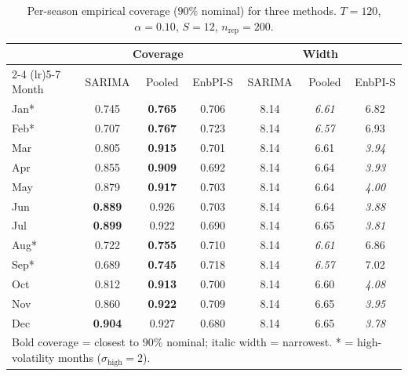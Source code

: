 \begin{table}[ht]
\centering
\caption{Per-season empirical coverage ($90\%$ nominal) for three methods.
$T=120$, $\alpha=0.10$, $S=12$, $n_{\mathrm{rep}}=200$.}
\label{tab:e1_three_methods_T120}
\begin{tabular}{l ccc ccc}
\toprule
 & \multicolumn{3}{c}{Coverage} & \multicolumn{3}{c}{Width} \\
\cmidrule(lr){2-4} \cmidrule(lr){5-7}
Month & SARIMA & Pooled & EnbPI-S & SARIMA & Pooled & EnbPI-S \\
\midrule
Jan* & 0.745 & \textbf{0.765} & 0.706 & 8.14 & \textit{6.61} & 6.82 \\
Feb* & 0.707 & \textbf{0.767} & 0.723 & 8.14 & \textit{6.57} & 6.93 \\
Mar & 0.805 & \textbf{0.915} & 0.701 & 8.14 & 6.61 & \textit{3.94} \\
Apr & 0.855 & \textbf{0.909} & 0.692 & 8.14 & 6.64 & \textit{3.93} \\
May & 0.879 & \textbf{0.917} & 0.703 & 8.14 & 6.64 & \textit{4.00} \\
Jun & \textbf{0.889} & 0.926 & 0.703 & 8.14 & 6.64 & \textit{3.88} \\
Jul & \textbf{0.899} & 0.922 & 0.690 & 8.14 & 6.65 & \textit{3.81} \\
Aug* & 0.722 & \textbf{0.755} & 0.710 & 8.14 & \textit{6.61} & 6.86 \\
Sep* & 0.689 & \textbf{0.745} & 0.718 & 8.14 & \textit{6.57} & 7.02 \\
Oct & 0.812 & \textbf{0.913} & 0.700 & 8.14 & 6.60 & \textit{4.08} \\
Nov & 0.860 & \textbf{0.922} & 0.709 & 8.14 & 6.65 & \textit{3.95} \\
Dec & \textbf{0.904} & 0.927 & 0.680 & 8.14 & 6.65 & \textit{3.78} \\
\bottomrule
\multicolumn{7}{l}{\footnotesize Bold coverage = closest to $90\%$ nominal; italic width = narrowest.  * = high-volatility months ($\sigma_{\mathrm{high}}=2$).} \\
\end{tabular}
\end{table}